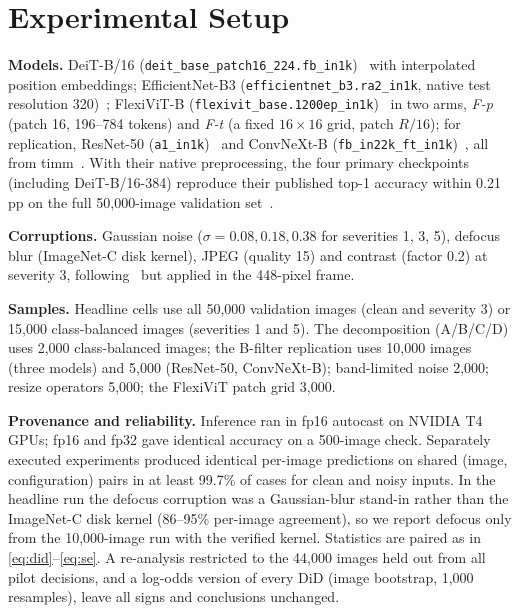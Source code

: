 \documentclass[conference]{IEEEtran}
\begin{document}
\section{Experimental Setup}
\textbf{Models.} DeiT-B/16 (\texttt{deit\_base\_patch16\_224.fb\_in1k})~\cite{touvron2021deit} with interpolated position embeddings; EfficientNet-B3 (\texttt{efficientnet\_b3.ra2\_in1k}, native test resolution 320)~\cite{tan2019efficientnet}; FlexiViT-B (\texttt{flexivit\_base.1200ep\_in1k})~\cite{beyer2023flexivit} in two arms, \emph{F-p} (patch 16, 196--784 tokens) and \emph{F-t} (a fixed $16\times16$ grid, patch $R/16$); for replication, ResNet-50 (\texttt{a1\_in1k})~\cite{wightman2021resnet} and ConvNeXt-B (\texttt{fb\_in22k\_ft\_in1k})~\cite{liu2022convnext}, all from timm~\cite{wightman2019timm}. With their native preprocessing, the four primary checkpoints (including DeiT-B/16-384) reproduce their published top-1 accuracy within 0.21\,pp on the full 50,000-image validation set~\cite{russakovsky2015imagenet}.

\textbf{Corruptions.} Gaussian noise ($\sigma=0.08,0.18,0.38$ for severities 1, 3, 5), defocus blur (ImageNet-C disk kernel), JPEG (quality 15) and contrast (factor 0.2) at severity 3, following~\cite{hendrycks2019benchmarking} but applied in the 448-pixel frame.

\textbf{Samples.} Headline cells use all 50,000 validation images (clean and severity 3) or 15,000 class-balanced images (severities 1 and 5). The decomposition (A/B/C/D) uses 2,000 class-balanced images; the B-filter replication uses 10,000 images (three models) and 5,000 (ResNet-50, ConvNeXt-B); band-limited noise 2,000; resize operators 5,000; the FlexiViT patch grid 3,000.

\textbf{Provenance and reliability.} Inference ran in fp16 autocast on NVIDIA T4 GPUs; fp16 and fp32 gave identical accuracy on a 500-image check. Separately executed experiments produced identical per-image predictions on shared (image, configuration) pairs in at least 99.7\% of cases for clean and noisy inputs. In the headline run the defocus corruption was a Gaussian-blur stand-in rather than the ImageNet-C disk kernel (86--95\% per-image agreement), so we report defocus only from the 10,000-image run with the verified kernel. Statistics are paired as in \eqref{eq:did}--\eqref{eq:se}. A re-analysis restricted to the 44,000 images held out from all pilot decisions, and a log-odds version of every DiD (image bootstrap, 1,000 resamples), leave all signs and conclusions unchanged.
\end{document}

